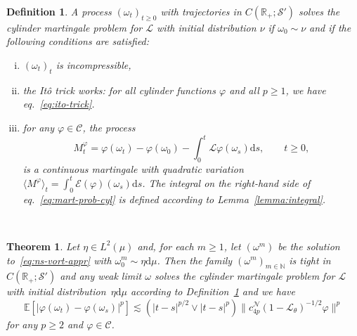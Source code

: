 \documentclass{article}
\newcommand{\mathd}{\mathrm{d}}
\newcommand{\tmem}[1]{{\em #1\/}}
\newenvironment{enumerateroman}{\begin{enumerate}[i.] }{\end{enumerate}}
\newtheorem{definition}{Definition}
\newtheorem{theorem}{Theorem}
\begin{document}
\begin{definition}
  \label{def:martpb-cyl}A process $(\omega_t)_{t \geqslant 0}$ with
  trajectories in $C (\mathbb{R}_+ ; \mathcal{S}')$ solves the {\tmem{cylinder
  martingale problem for $\mathcal{L}$ with initial distribution $\nu$}} if
  $\omega_0 \sim \nu$ and if the following conditions are satisfied:
  \begin{enumerateroman}
    \item $(\omega_t)_t$ is incompressible,
    
    \item the It{\^o} trick works: for all cylinder functions $\varphi$ and
    all $p \geqslant 1$, we have eq.~{\eqref{eq:ito-trick}}.
    
    \item for any $\varphi \in \mathcal{C}$, the process
    \begin{equation}
      M_t^{\varphi} = \varphi (\omega_t) - \varphi (\omega_0) - \int_0^t
      \mathcal{L} \varphi (\omega_s) \mathd s, \qquad t \geqslant 0,
      \label{eq:mart-prob-cyl}
    \end{equation}
    is a continuous martingale with quadratic variation $\langle M^{\varphi}
    \rangle_t = \int_0^t \mathcal{E} (\varphi) (\omega_s) \mathd s$. The
    integral on the right-hand side of eq.~{\eqref{eq:mart-prob-cyl}} is
    defined according to Lemma~\ref{lemma:integral}.
  \end{enumerateroman}
\end{definition}

\

\begin{theorem}
  \label{thm:existence-cyl-martingalepb}Let $\eta \in L^2 (\mu)$ and, for each
  $m \geqslant 1$, let $(\omega^m)$ be the solution
  to~{\eqref{eq:ns-vort-appr}} with $\omega^m_0 \sim \eta \mathd \mu$. Then
  the family $(\omega^m)_{m \in \mathbb{N}}$ is tight in $C (\mathbb{R}_+ ;
  \mathcal{S}')$ and any weak limit $\omega$ solves the cylinder martingale
  problem for $\mathcal{L}$ with initial distribution~$\eta \mathd \mu$
  according to Definition~\ref{def:martpb-cyl} and we have
  \begin{equation}
    \mathbb{E} [| \varphi (\omega_t) - \varphi (\omega_s) |^p] \lesssim (| t -
    s |^{p / 2} \vee | t - s |^p) \| c_{4 p}^{\mathcal{N}} (1
    -\mathcal{L}_{\theta})^{- 1 / 2} \varphi \|^p \label{eq:mod-cont}
  \end{equation}
  for any $p \geqslant 2$ and $\varphi \in \mathcal{C}$.
\end{theorem}
\end{document}
